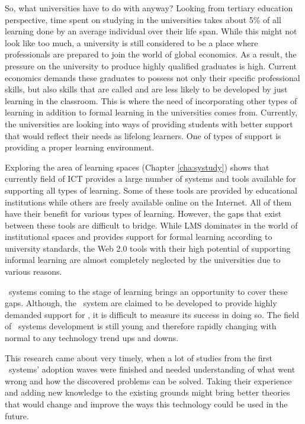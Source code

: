 So, what universities have to do with \LLLs anyway? Looking from tertiary
education perspective, time spent on studying in the universities takes about
5\% of all learning done by an average individual over their life span. While
this might not look like too much, a university is still considered to be a
place where professionals are prepared to join the world of global economics. As
a result, the pressure on the university to produce highly qualified graduates
is high. Current economics demands these graduates to possess not only their
specific professional skills, but also skills that are called \LLLs and are less
likely to be developed by just learning in the classroom. This is where the
need of incorporating other types of learning in addition to formal learning in
the universities comes from. Currently, the universities are looking into ways
of providing students with better support that would reflect their needs as
lifelong learners. One of types of support is providing a proper learning
environment.


Exploring the area of learning spaces (Chapter \ref{cha:systudy}) shows that
currently field of ICT provides a large number of systems and tools available
for supporting all types of learning. Some of these tools are provided by
educational institutions while others are freely available online on the Internet. All
of them have their benefit for various types of learning. However, the gaps
that exist between these tools are difficult to bridge. While LMS dominates in
the world of institutional spaces and provides support for formal learning
according to university standards, the Web 2.0 tools with their high potential
of supporting informal learning are almost completely neglected by the
universities due to various reasons.

\ep~systems coming to the stage of learning brings an opportunity to cover these
gaps. Although, the \ep~system are claimed to be developed to provide highly
demanded support for \LLLsn, it is difficult to measure its success in doing so.
The field of \ep~systems development is still young and therefore rapidly
changing with normal to any technology trend ups and downs.

This research came about very timely, when a lot of studies from the first
\ep~systems' adoption waves were finished and needed understanding of what went
wrong and how the discovered problems can be solved. Taking their experience and
adding new knowledge to the existing grounds might bring better theories that
would change and improve the ways this technology could be used in the future.

